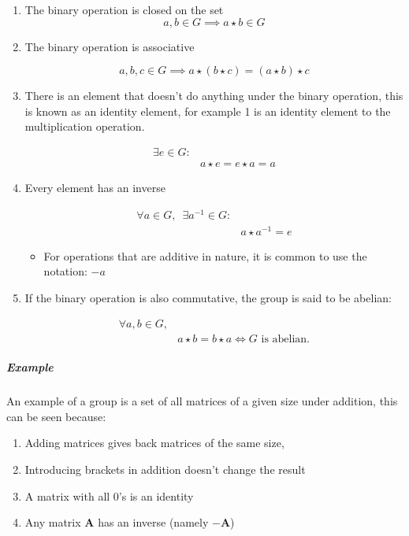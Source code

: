 \documentclass[a4paper,11pt,twoside]{article}
\begin{document}
\begin{enumerate}
\item The binary operation is closed on the set
\[a,b \in G \implies a\star b \in G\]
\item The binary operation is associative

\[a,b,c \in G \implies a\star (b\star c) = (a\star b)\star c\]
\item There is an element that doesn't do anything under the binary
operation, this is known as an identity element, for example 1 is
an identity element to the multiplication operation.

\begin{align*}
\exists e \in G:&\\
		& a\star e = e \star a = a
\end{align*}
\item Every element has an inverse

  \begin{align*}
  \forall a \in G,\enspace \exists a^{-1} \in G:	&\\
						   & a\star a^{-1} = e
\end{align*}

\begin{itemize}
\item For operations that are additive in nature, it is common to use
the notation: \(-a\) \cite[\S 3.3]{gregoryleeAbstractAlgebra2018}
\end{itemize}
\item If the binary operation is also commutative, the group is said to be abelian:

\begin{align*}
\forall a,b \in G,& \nonumber \\
		& a \star b = b \star a \iff G \text{ is abelian.} 
\end{align*}
\end{enumerate}

\subparagraph{Example}
\label{sec:org673f141}

An example of a group is a set of all matrices of a given size under addition,
this can be seen because:

\begin{enumerate}
\item Adding matrices gives back matrices of the same size,
\item Introducing brackets in addition doesn't change the result
\item A matrix with all 0's is an identity
\item Any matrix \(\mathbf{A}\) has an inverse (namely \(-\mathbf{A}\))
\end{enumerate}
\end{document}
